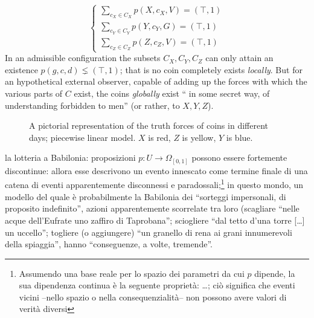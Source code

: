\begin{example}
\[\begin{cases}
    \sum_{c_X\in C_X} p(X,c_X,V) = (\top,1)\\
    \sum_{c_Y\in C_Y} p(Y,c_Y,G) = (\top,1)\\
    \sum_{c_Z\in C_Z} p(Z,c_Z,V) = (\top,1)
  \end{cases}  
  \]
  In an admissible configuration the subsets $ C_X, C_Y, C_Z $ can only attain an existence $p(g,c,d) \lneq (\top,1)$; that is no coin completely exists \emph{locally}. But for an hypothetical external observer, capable of adding up the forces with which the various parts of $C$ exist, the coins \emph{globally} exist `` in some secret way, of understanding forbidden to men'' (or rather, to $ X, Y, Z $).
  \begin{center}
  \begin{figure}
      \caption{A pictorial representation of the truth forces of coins in different days; piecewise linear model. $X$ is red, $Z$ is yellow, $Y$ is blue.}
  \end{figure}
\end{center}
\end{example}
\begin{example}
  la lotteria a Babilonia: proposizioni $p : U \to \Omega_{[0,1]}$ possono essere fortemente discontinue: allora esse descrivono un evento innescato come termine finale di una catena di eventi apparentemente disconnessi e paradossali;\footnote{Assumendo una base reale per lo spazio dei parametri da cui $p$ dipende, la sua dipendenza continua è la seguente proprietà: \dots; ciò significa che eventi vicini --nello spazio o nella consequenzialità-- non possono avere valori di verità diversi} in questo mondo, un modello del quale è probabilmente la Babilonia dei ``sorteggi impersonali, di proposito indefinito'', azioni apparentemente scorrelate tra loro (scagliare ``nelle acque dell'Eufrate uno zaffiro di Taprobana''; sciogliere ``dal tetto d'una torre [\dots\unkern] un uccello''; togliere (o aggiungere) ``un granello di rena ai grani innumerevoli della spiaggia'', hanno ``conseguenze, a volte, tremende''.
\end{example}
